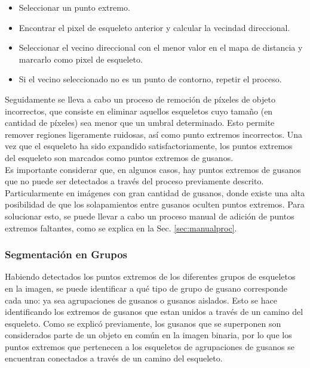 \begin{itemize}
\item Seleccionar un punto extremo.
\item Encontrar el pixel de esqueleto anterior y calcular la
  vecindad direccional.
\item Seleccionar el vecino direccional con el menor valor en el
  mapa de distancia y marcarlo como pixel de esqueleto.
\item Si el vecino seleccionado no es un punto de contorno, repetir
  el proceso.
\end{itemize}

Seguidamente se lleva a cabo un proceso de remoci\'on de p\'ixeles de objeto 
incorrectos, que consiste en eliminar aquellos esqueletos cuyo tama\~no (en 
cantidad de p\'ixeles) sea menor que un umbral determinado. Esto permite remover
regiones ligeramente ruidosas, as\'i como punto extremos incorrectos.
Una vez que el esqueleto ha sido expandido satisfactoriamente, los puntos
extremos del esqueleto son marcados como puntos extremos de gusanos.\\

Es importante considerar que, en algunos casos, hay puntos extremos de gusanos
que no puede ser detectados a trav\'es del proceso previamente descrito. 
Particularmente en im\'agenes con gran cantidad de gusanos, donde existe
una alta posibilidad de que los solapamientos entre gusanos oculten
puntos extremos. Para solucionar esto, se puede llevar a cabo un proceso
manual de adici\'on de puntos extremos faltantes, como se explica en 
la Sec. \ref{sec:manualproc}.


\subsubsection*{Segmentaci\'on en Grupos}


Habiendo detectados los puntos extremos de los diferentes grupos de esqueletos
en la imagen, se puede identificar a qu\'e tipo de grupo de gusano corresponde cada uno:
ya sea agrupaciones de gusanos o gusanos aislados. Esto se hace identificando
los extremos de gusanos que estan unidos a trav\'es de un camino del esqueleto.
Como se explic\'o previamente, los gusanos que se superponen son considerados 
parte de un objeto en com\'un en la imagen binaria, por lo que los puntos
extremos que pertenecen a los esqueletos de agrupaciones de gusanos se encuentran
conectados a trav\'es de un camino del esqueleto.\\

